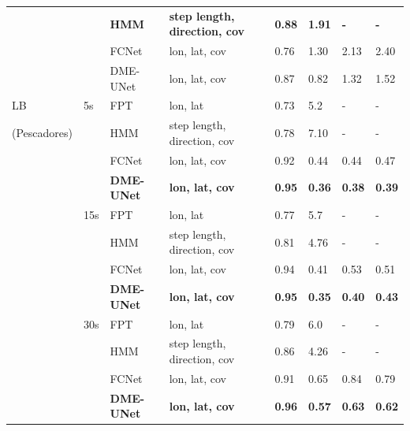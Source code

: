 \documentclass{article}
\begin{document}
\begin{table}[h]
\begin{tabular}{llllllll}
             &     & \textbf{HMM}    & \textbf{step length, direction, cov} & \textbf{0.88} & \textbf{1.91} & \textbf{-} & \textbf{-}       \\
             &     & FCNet  & lon, lat, cov          & 0.76 & 1.30 & 2.13 & 2.40 \\
             &     & DME-UNet   & lon, lat, cov  & 0.87 & 0.82 & 1.32 & 1.52 \\
    \midrule
    LB       & 5s  & FPT    & lon, lat               & 0.73 & 5.2 & - & -        \\
(Pescadores) &     & HMM    & step length, direction, cov & 0.78 & 7.10 & - & -      \\
             &     & FCNet  & lon, lat, cov          & 0.92 & 0.44 & 0.44 & 0.47  \\
             &     & \textbf{DME-UNet}   & \textbf{lon, lat, cov}  & \textbf{0.95} & \textbf{0.36} & \textbf{0.38} & \textbf{0.39}  \\
             & 15s & FPT    & lon, lat               & 0.77 & 5.7 & - & -      \\
             &     & HMM    & step length, direction, cov & 0.81 & 4.76 & - & -  \\
             &     & FCNet  & lon, lat, cov          & 0.94 & 0.41 & 0.53 & 0.51  \\
             &     & \textbf{DME-UNet}   & \textbf{lon, lat, cov}  & \textbf{0.95} & \textbf{0.35} & \textbf{0.40} & \textbf{0.43}  \\
             & 30s & FPT    & lon, lat               & 0.79 & 6.0 & - & -      \\
             &     & HMM    & step length, direction, cov & 0.86 & 4.26 & - & - \\
             &     & FCNet  & lon, lat, cov          & 0.91 & 0.65 & 0.84 & 0.79  \\
             &     & \textbf{DME-UNet}   & \textbf{lon, lat, cov}  & \textbf{0.96} & \textbf{0.57} & \textbf{0.63} & \textbf{0.62}  \\
    \bottomrule
  \end{tabular}
  \label{table2}
\end{table}
\end{document}
